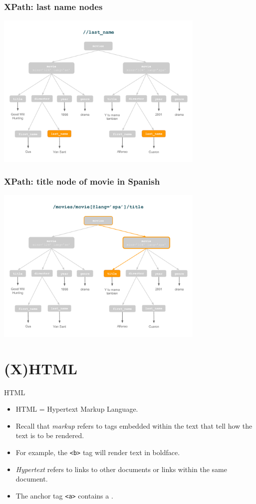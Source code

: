 \documentclass[svgnames]{beamer}
\begin{document}
\begin{frame}
\frametitle{XPath: last name nodes}
\begin{center}
\includegraphics[width=10cm]{xpath_lastname.pdf}
\end{center}
\end{frame}


\begin{frame}
\frametitle{XPath: title node of movie in Spanish}
\begin{center}
\includegraphics[width=10cm]{xpath_ytmt.pdf}
\end{center}
\end{frame}

\section{(X)HTML}

\begin{frame}[fragile]{HTML}
\begin{itemize}
	\item HTML = Hypertext Markup Language.
	\item Recall that {\it markup} refers to \alert{tags} embedded within the text that tell how the text is to be rendered.
	\item For example, the \texttt{<b>} tag will render text in boldface.
	\item \emph{Hypertext} refers to links to other documents or links within the same document.
	\item The anchor tag \texttt{<a>} contains a .
\end{itemize}
\end{frame}
\end{document}
